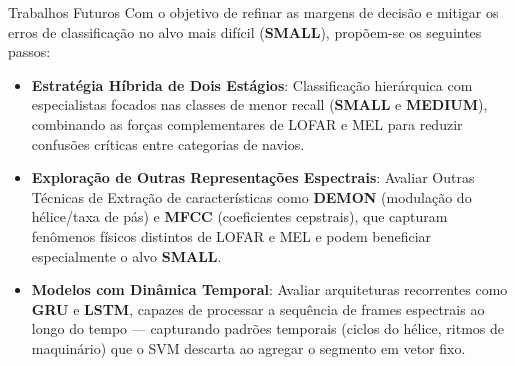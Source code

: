 \documentclass{beamer}
\begin{document}
\begin{frame}{Trabalhos Futuros}
    \footnotesize
    Com o objetivo de refinar as margens de decisão e mitigar os erros de classificação no alvo mais difícil (\textbf{SMALL}), propõem-se os seguintes passos:

    \vspace{0.1cm}
    \begin{itemize}
        \setlength{\itemsep}{5pt}
        \item \textbf{Estratégia Híbrida de Dois Estágios}: Classificação hierárquica com especialistas focados nas classes de menor recall (\textbf{SMALL} e \textbf{MEDIUM}), combinando as forças complementares de LOFAR e MEL para reduzir confusões críticas entre categorias de navios.
        \item \textbf{Exploração de Outras Representações Espectrais}: Avaliar Outras Técnicas de Extração de características como \textbf{DEMON} (modulação do hélice/taxa de pás) e \textbf{MFCC} (coeficientes cepstrais), que capturam fenômenos físicos distintos de LOFAR e MEL e podem beneficiar especialmente o alvo \textbf{SMALL}.
        \item \textbf{Modelos com Dinâmica Temporal}: Avaliar arquiteturas recorrentes como \textbf{GRU} e \textbf{LSTM}, capazes de processar a sequência de frames espectrais ao longo do tempo — capturando padrões temporais (ciclos do hélice, ritmos de maquinário) que o SVM descarta ao agregar o segmento em vetor fixo.
    \end{itemize}
\end{frame}
\end{document}
